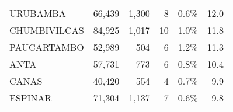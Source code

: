 \begin{tabular}{lrrrrr}
	\cellcolor[HTML]{FFFFC7}URUBAMBA      & 66,439                                                         & 1,300                                                                            & 8                                                                & 0.6\%                                                                  & 12.0                                                                                                                              \\
	\cellcolor[HTML]{FFFFC7}CHUMBIVILCAS  & 84,925                                                         & 1,017                                                                            & 10                                                               & 1.0\%                                                                  & 11.8                                                                                                                              \\
	\cellcolor[HTML]{FFFFC7}PAUCARTAMBO   & 52,989                                                         & 504                                                                              & 6                                                                & 1.2\%                                                                  & 11.3                                                                                                                              \\
	\cellcolor[HTML]{FFFFC7}ANTA          & 57,731                                                         & 773                                                                              & 6                                                                & 0.8\%                                                                  & 10.4                                                                                                                              \\
	\cellcolor[HTML]{FFFFC7}CANAS         & 40,420                                                         & 554                                                                              & 4                                                                & 0.7\%                                                                  & 9.9                                                                                                                               \\
	\cellcolor[HTML]{FFFFC7}ESPINAR       & 71,304                                                         & 1,137                                                                            & 7                                                                & 0.6\%                                                                  & 9.8                                                                                                                               \\

\end{tabular}
